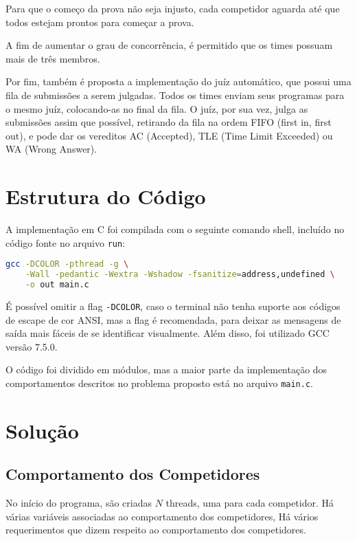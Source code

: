 \documentclass[11pt]{article}
\newcommand{\code}{\lstinline[mathescape=true]}
\begin{document}
    Para que o começo da prova não seja injusto, cada competidor aguarda até que todos estejam prontos
    para começar a prova.

    A fim de aumentar o grau de concorrência, é permitido que os times possuam mais de três membros.

    Por fim, também é proposta a implementação do juíz automático, que possui uma fila de submissões a
    serem julgadas. Todos os times enviam seus programas para o mesmo juíz, colocando-as no final da
    fila. O juíz, por sua vez, julga as submissões assim que possível, retirando da fila na ordem FIFO
    (first in, first out), e pode dar os vereditos AC (Accepted), TLE (Time Limit Exceeded) ou WA (Wrong
    Answer).

\section{Estrutura do Código}
	A implementação em C foi compilada com o seguinte comando shell, incluído no código fonte no arquivo
	\code{run}:

	\begin{lstlisting}[language=bash, caption=run]
gcc -DCOLOR -pthread -g \
    -Wall -pedantic -Wextra -Wshadow -fsanitize=address,undefined \
    -o out main.c
	\end{lstlisting}

	É possível omitir a flag \code{-DCOLOR}, caso o terminal não tenha suporte aos códigos de escape de
	cor ANSI\cite{ansi_color}, mas a flag é recomendada, para deixar as mensagens de saída mais fáceis de
	se identificar visualmente. Além disso, foi utilizado GCC versão 7.5.0.

	O código foi dividido em módulos, mas a maior parte da implementação dos comportamentos descritos no
	problema proposto está no arquivo \code{main.c}.

\section{Solução}

\subsection{Comportamento dos Competidores}
	No início do programa, são criadas $N$ threads, uma para cada competidor. Há várias variáveis
	associadas ao comportamento dos competidores, %
	Há vários requerimentos que dizem respeito ao comportamento dos competidores.
\end{document}

